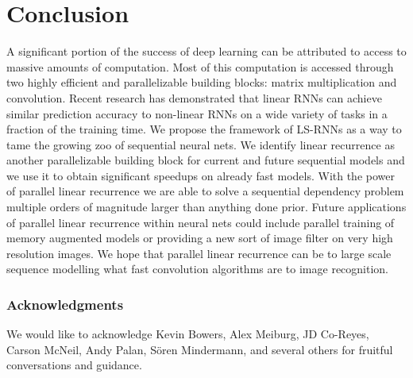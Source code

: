 \documentclass{article}
\begin{document}

\section{Conclusion}
A significant portion of the success of deep learning can be attributed to access to massive
amounts of computation. Most of this computation is accessed through two
highly efficient and parallelizable building blocks:
matrix multiplication and convolution. Recent research has demonstrated that
linear RNNs can achieve similar prediction accuracy to non-linear RNNs on a wide
variety of tasks in a fraction of the training time. We propose the framework of
LS-RNNs as a way to tame the growing zoo of sequential neural nets. We identify linear
recurrence as another parallelizable building block for current and future sequential models
and we use it to obtain significant speedups on already fast models.
With the power of parallel
linear recurrence we are able to solve a sequential dependency problem multiple
orders of magnitude larger than anything done prior.
Future applications of parallel linear recurrence within neural nets could include
parallel training of memory augmented models or providing a new sort of image filter
on very high resolution images.
We hope that parallel linear recurrence can be to large scale sequence
modelling what fast convolution algorithms are to image recognition.

\subsubsection*{Acknowledgments}
We would like to acknowledge Kevin Bowers, Alex Meiburg, JD Co-Reyes, Carson
McNeil, Andy Palan, Sören Mindermann, and several others for fruitful conversations and guidance.
\end{document}
